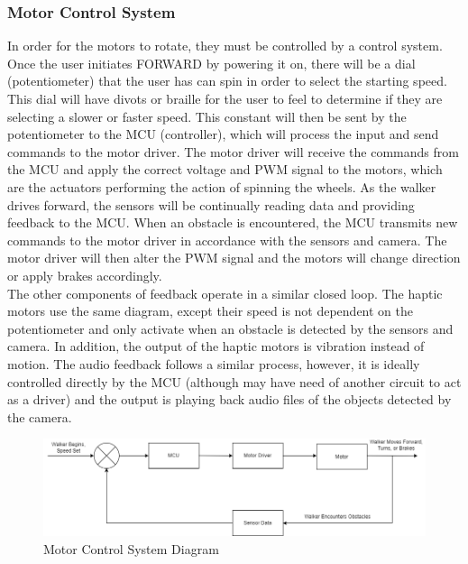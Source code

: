 \subsubsection{Motor Control System}
\noindent In order for the motors to rotate, they must be controlled by a control system. Once the user initiates FORWARD by powering it on, there will be a dial (potentiometer) that the user has can spin in order to select the starting speed. This dial will have divots or braille for the user to feel to determine if they are selecting a slower or faster speed. This constant will then be sent by the potentiometer to the MCU (controller), which will process the input and send commands to the motor driver. The motor driver will receive the commands from the MCU and apply the correct voltage and PWM signal to the motors, which are the actuators performing the action of spinning the wheels. As the walker drives forward, the sensors will be continually reading data and providing feedback to the MCU. When an obstacle is encountered, the MCU transmits new commands to the motor driver in accordance with the sensors and camera. The motor driver will then alter the PWM signal and the motors will change direction or apply brakes accordingly.\\

\noindent The other components of feedback operate in a similar closed loop. The haptic motors use the same diagram, except their speed is not dependent on the potentiometer and only activate when an obstacle is detected by the sensors and camera. In addition, the output of the haptic motors is vibration instead of motion. The audio feedback follows a similar process, however, it is ideally controlled directly by the MCU (although may have need of another circuit to act as a driver) and the output is playing back audio files of the objects detected by the camera.

\begin{figure}[H]
	\centering
	\includegraphics[width=1\textwidth]{./Images/control_system_speed}
	\caption{\label{fig:Motor_Control_System}Motor Control System Diagram}
\end{figure}

